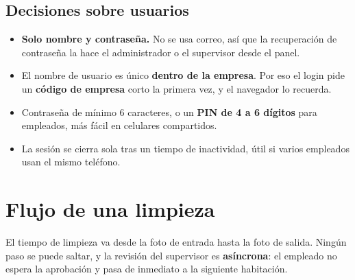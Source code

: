 \documentclass[11pt,a4paper]{article}
\begin{document}
\subsection{Decisiones sobre usuarios}

\begin{itemize}[leftmargin=1.2em]
  \item \textbf{Solo nombre y contraseña.} No se usa correo, así que la recuperación de contraseña la hace el administrador o el supervisor desde el panel.
  \item El nombre de usuario es único \textbf{dentro de la empresa}. Por eso el login pide un \textbf{código de empresa} corto la primera vez, y el navegador lo recuerda.
  \item Contraseña de mínimo 6 caracteres, o un \textbf{PIN de 4 a 6 dígitos} para empleados, más fácil en celulares compartidos.
  \item La sesión se cierra sola tras un tiempo de inactividad, útil si varios empleados usan el mismo teléfono.
\end{itemize}

\section{Flujo de una limpieza}

El tiempo de limpieza va desde la foto de entrada hasta la foto de salida. Ningún paso se puede saltar, y la revisión del supervisor es \textbf{asíncrona}: el empleado no espera la aprobación y pasa de inmediato a la siguiente habitación.
\end{document}
